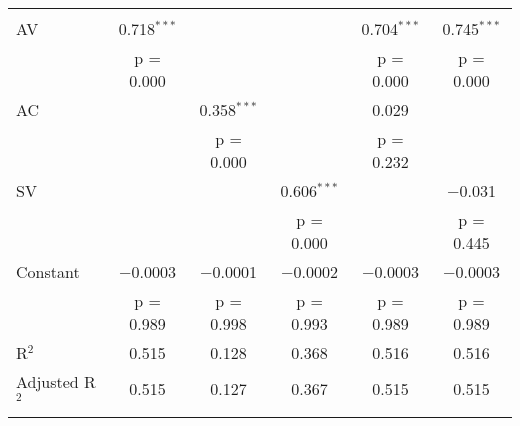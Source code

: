 
\begin{tabular}{@{\extracolsep{5pt}}lccccc} 
\\[-1.8ex]
\hline \\[-1.8ex] 
 AV & 0.718$^{***}$ &  &  & 0.704$^{***}$ & 0.745$^{***}$ \\ 
  & p = 0.000 &  &  & p = 0.000 & p = 0.000 \\ 
 AC &  & 0.358$^{***}$ &  & 0.029 &  \\ 
  &  & p = 0.000 &  & p = 0.232 &  \\ 
 SV &  &  & 0.606$^{***}$ &  & $-$0.031 \\ 
  &  &  & p = 0.000 &  & p = 0.445 \\ 
 Constant & $-$0.0003 & $-$0.0001 & $-$0.0002 & $-$0.0003 & $-$0.0003 \\ 
  & p = 0.989 & p = 0.998 & p = 0.993 & p = 0.989 & p = 0.989 \\ 
R$^{2}$ & 0.515 & 0.128 & 0.368 & 0.516 & 0.516 \\ 
Adjusted R$^{2}$ & 0.515 & 0.127 & 0.367 & 0.515 & 0.515 \\ 
\hline \\[-1.8ex] 
\end{tabular} 
